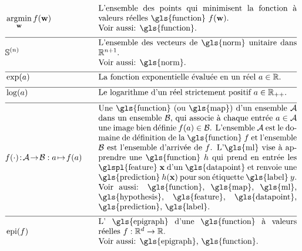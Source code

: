 \newpage
\begin{align}
	&\argmin_{\weights} f(\weights) &\quad &\parbox{.70\textwidth}{L'ensemble des points qui minimisent la fonction à valeurs réelles \gls{function} $f(\weights)$. 
		\\ Voir aussi: \gls{function}.} \nonumber \\[2mm] \hline \nonumber\\[-5mm]
	&\sphere{\nrnodes} &\quad &\parbox{.70\textwidth}{L'ensemble des vecteurs de \gls{norm} unitaire dans $\mathbb{R}^{\nrnodes+1}$.
		\\ Voir aussi: \gls{norm}.} \nonumber \\[2mm] \hline \nonumber\\[-5mm]
	& \exp(a) & \quad & \parbox{.70\textwidth}{La fonction exponentielle évaluée en un réel $a \in \mathbb{R}$.} \nonumber \\[2mm] \hline \nonumber \\[-5mm]
	&\log(a) &\quad &\parbox{.70\textwidth}{Le logarithme d'un réel strictement positif $a \in \mathbb{R}_{++}$.} \nonumber \\[2mm] \hline \nonumber\\[-5mm]
	&f(\cdot)\!:\!\mathcal{A}\!\rightarrow\!\mathcal{B} :  a \!\mapsto\!f(a) &\quad &\parbox{.70\textwidth}{
		Une \gls{function} (ou \gls{map}) d'un ensemble $\mathcal{A}$ dans un ensemble $\mathcal{B}$, qui associe à chaque entrée
		$a \in \mathcal{A}$ une image bien définie $f(a) \in \mathcal{B}$.
		L'ensemble $\mathcal{A}$ est le domaine de définition de la \gls{function} $f$ et l'ensemble $\mathcal{B}$ est l'ensemble d'arrivée de $f$. L'\gls{ml} vise à apprendre une \gls{function} $\hypothesis$ qui prend en entrée les \glspl{feature} 
		$\featurevec$ d'un \gls{datapoint} et renvoie une \gls{prediction} $\hypothesis(\featurevec)$ pour son étiquette \gls{label} $\truelabel$.
		\\ Voir aussi: \gls{function}, \gls{map}, \gls{ml}, \gls{hypothesis}, \gls{feature}, \gls{datapoint}, \gls{prediction}, \gls{label}.} \nonumber \\[2mm] \hline \nonumber\\[-5mm]
	&\operatorname{epi}(f)  & \quad & \parbox{.70\textwidth}{L' \gls{epigraph} d'une \gls{function} à valeurs réelles
		$f: \mathbb{R}^{\featuredim}\rightarrow \mathbb{R}$.
		\\ Voir aussi: \gls{epigraph}, \gls{function}.} \nonumber
\end{align} 

